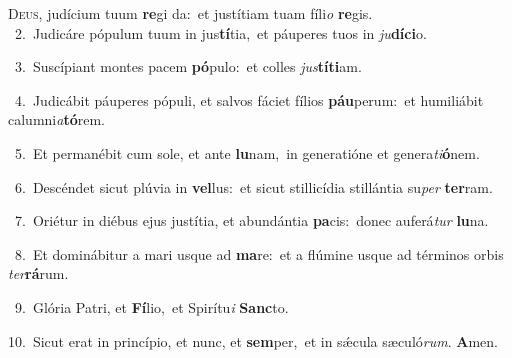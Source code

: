 \lettrine{\initial\textcolor{\initialcolor}{D}}{eus,} judícium tuum \textbf{re}\-gi da:~\star et justítiam tuam fíli\textit{o} \textbf{re}\-gis.\\
{\numbfont\textcolor{\numbcolor}{~2.}}~Judicáre pópulum tuum in jus\-\textbf{tí}\-tia,~\star et páuperes tuos in \textit{ju}\-\textbf{dí}\textbf{ci}o.\par
{\numbfont\textcolor{\numbcolor}{~3.}}~Suscípiant montes pacem \textbf{pó}\-pulo:~\star et colles \textit{jus}\-\textbf{tí}\textbf{ti}am.\par
{\numbfont\textcolor{\numbcolor}{~4.}}~Judicábit páuperes pópuli, et salvos fáciet fílios \textbf{páu}\-perum:~\star et humiliábit calumni\-\textit{a}\-\textbf{tó}rem.\par
{\numbfont\textcolor{\numbcolor}{~5.}}~Et permanébit cum sole, et ante \textbf{lu}\-nam,~\star in generatióne et genera\-\textit{ti}\-\textbf{ó}nem.\par
{\numbfont\textcolor{\numbcolor}{~6.}}~Descéndet sicut plúvia in \textbf{vel}\-lus:~\star et sicut stillicídia stillántia su\textit{per} \textbf{ter}\-ram.\par
{\numbfont\textcolor{\numbcolor}{~7.}}~Oriétur in diébus ejus justítia, et abundántia \textbf{pa}\-cis:~\star donec auferá\textit{tur} \textbf{lu}\-na.\par
{\numbfont\textcolor{\numbcolor}{~8.}}~Et dominábitur a mari usque ad \textbf{ma}\-re:~\star et a flúmine usque ad términos orbis \textit{ter}\-\textbf{rá}rum.\par
{\numbfont\textcolor{\numbcolor}{~9.}}~Glória Patri, et \textbf{Fí}\-lio,~\star et Spirítu\textit{i} \textbf{Sanc}\-to.\par
{\numbfont\textcolor{\numbcolor}{10.}}~Sicut erat in princípio, et nunc, et \textbf{sem}\-per,~\star et in sǽcula sæculó\-\textit{rum}\-. \textbf{A}\-men.\par
